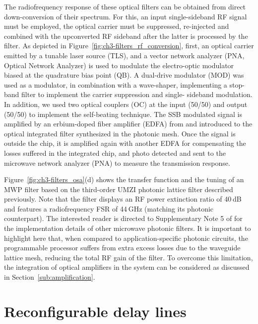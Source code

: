 The radiofrequency response of these optical filters can be obtained from direct down-conversion of their spectrum.
For this, an input single-sideband RF signal must be employed, the optical carrier must be suppressed, re-injected and combined with the upconverted RF sideband after the latter is processed by the filter.
As depicted in Figure~\ref{fig:ch3-filters_rf_conversion}, first, an optical carrier emitted by a tunable laser source (TLS), and a vector network analyzer (PNA, Optical Network Analyzer) is used to modulate the electro-optic modulator biased at the quadrature bias point (QB).
A dual-drive modulator (MOD) was used as a modulator, in combination with a wave-shaper, implementing a stop-band filter to implement the carrier suppression and single- sideband modulation.
In addition, we used two optical couplers (OC) at the input (50/50) and output (50/50) to implement the self-beating technique.
The SSB modulated signal is amplified by an erbium-doped fiber amplifier (EDFA) from and introduced to the optical integrated filter synthesized in the photonic mesh.
Once the signal is outside the chip, it is amplified again with another EDFA for compensating the losses suffered in the integrated chip, and photo detected and sent to the microwave network analyzer (PNA) to measure the transmission response.

Figure~\ref{fig:ch3-filters_osa}(d) shows the transfer function and the tuning of an MWP filter based on the third-order UMZI photonic lattice filter described previously.
Note that the filter displays an RF power extinction ratio of 40 dB and features a radiofrequency FSR of 44 GHz (matching its photonic counterpart).
The interested reader is directed to Supplementary Note 5 of \cite{perez-lopez_supplementary_2024} for the implementation details of other microwave photonic filters.
It is important to highlight here that, when compared to application-specific photonic circuits, the programmable processor suffers from extra excess losses due to the waveguide lattice mesh, reducing the total RF gain of the filter.
To overcome this limitation, the integration of optical amplifiers in the system can be considered as discussed in Section~\ref{sub:amplification}.


\section{Reconfigurable delay lines}\label{sec:reconfigurable_delay_lines} %

